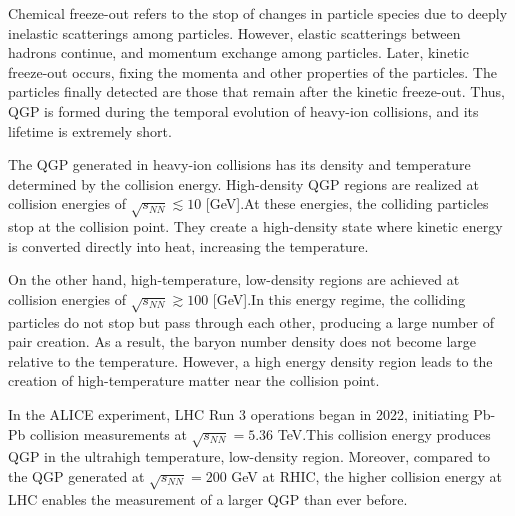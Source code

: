         Chemical freeze-out refers to the stop of changes in particle species due to deeply inelastic scatterings among particles. However, elastic scatterings between hadrons continue, and momentum exchange among particles. Later, kinetic freeze-out occurs, fixing the momenta and other properties of the particles. The particles finally detected are those that remain after the kinetic freeze-out. Thus, QGP is formed during the temporal evolution of heavy-ion collisions, and its lifetime is extremely short. 
        
        
        
        The QGP generated in heavy-ion collisions has its density and temperature determined by the collision energy. High-density QGP regions are realized at collision energies of $\sqrt{s_{NN}} \lesssim 10$ [GeV].\@ At these energies, the colliding particles stop at the collision point. They create a high-density state where kinetic energy is converted directly into heat, increasing the temperature.  
  
        On the other hand, high-temperature, low-density regions are achieved at collision energies of $\sqrt{s_{NN}} \gtrsim 100$ [GeV].\@ In this energy regime, the colliding particles do not stop but pass through each other, producing a large number of pair creation. As a result, the baryon number density does not become large relative to the temperature. However, a high energy density region leads to the creation of high-temperature matter near the collision point.  
        
        In the ALICE experiment, LHC Run 3 operations began in 2022, initiating Pb-Pb collision measurements at $\sqrt{s_{NN}} = 5.36$ TeV.\@ This collision energy produces QGP in the ultrahigh temperature, low-density region. Moreover, compared to the QGP generated at $\sqrt{s_{NN}} = 200$ GeV at RHIC, the higher collision energy at LHC enables the measurement of a larger QGP than ever before.

